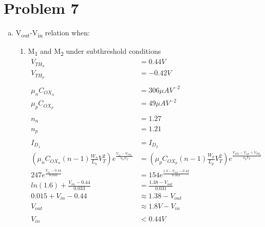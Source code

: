 \documentclass{article}
\begin{document}
\section{Problem 7}
\label{sec:org3947a43}
\begin{enumerate}[(a)]
\item V\textsubscript{out}-V\textsubscript{in} relation when:
\begin{enumerate}[1.]
\item M\textsubscript{1} and M\textsubscript{2} under subthreshold conditions
\begin{equation*}
\begin{aligned}
V_{TH_{n}} &= 0.44 V \\
V_{TH_{p}} &= -0.42 V \\
\\
\mu_{n}C_{OX_{n}} &= 306 \mu{}AV^{-2} \\
\mu_{p}C_{OX_{p}} &= 49 \mu{}AV^{-2} \\
\\
n_{n} &= 1.27 \\
n_{p} &= 1.21 \\
\\
I_{D_{1}} &= I_{D_{2}} \\
(\mu_{n}C_{OX_{n}}(n - 1)\frac{W_{n}}{L_{n}}V_{T}^{2}) e^{\frac{V_{in} - V_{TH_{n}}}{n_{n}V_{T}}} &=
(\mu_{p}C_{OX_{p}}(n - 1)\frac{W_{p}}{L_{p}}V_{T}^{2}) e^{\frac{V_{DD} - V_{out} + V_{TH_{p}}}{n_{p}V_{T}}} \\
247 e^{\frac{V_{in} - 0.44}{0.033}} &= 154 e^{\frac{1.8 - V_{out} - 0.42}{0.031}} \\
ln(1.6) + \frac{V_{in} - 0.44}{0.033} &= \frac{1.38 - V_{out}}{0.031} \\
0.015 + V_{in} - 0.44 &\approx 1.38 - V_{out} \\
V_{out} &\approx 1.8V - V_{in} \\
\\
V_{in} &< 0.44 V
\end{aligned}
\end{equation*}


\end{enumerate}
\end{enumerate}
\end{document}
